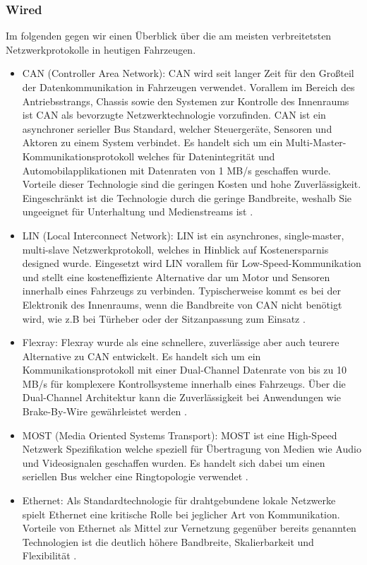         \subsubsection{Wired}
        Im folgenden gegen wir einen Überblick über die am meisten verbreitetsten Netzwerkprotokolle in heutigen Fahrzeugen. 
            \begin{itemize}
                \item CAN (Controller Area Network): CAN wird seit langer Zeit für den Großteil der Datenkommunikation in Fahrzeugen verwendet.
                Vorallem im Bereich des Antriebsstrangs, Chassis sowie den Systemen zur Kontrolle des Innenraums ist CAN als bevorzugte Netzwerktechnologie vorzufinden.
                CAN ist ein asynchroner serieller Bus Standard, welcher Steuergeräte, Sensoren und Aktoren zu einem System verbindet. Es handelt sich um ein 
                Multi-Master-Kommunikationsprotokoll welches für Datenintegrität und Automobilapplikationen mit Datenraten von 1 MB/s geschaffen wurde. Vorteile
                dieser Technologie sind die geringen Kosten und hohe Zuverlässigkeit. Eingeschränkt ist die Technologie durch die geringe Bandbreite, weshalb Sie
                ungeeignet für Unterhaltung und Medienstreams ist \cite{TW_huang2018vehicle}.
                \item LIN (Local Interconnect Network): LIN ist ein asynchrones, single-master, multi-slave Netzwerkprotokoll, welches in Hinblick auf Kostenersparnis 
                designed wurde. Eingesetzt wird LIN vorallem für Low-Speed-Kommunikation und stellt eine kosteneffiziente Alternative dar um Motor und Sensoren innerhalb 
                eines Fahrzeugs zu verbinden. Typischerweise kommt es bei der Elektronik des Innenraums, wenn die Bandbreite von CAN nicht benötigt wird, wie z.B bei Türheber
                oder der Sitzanpassung zum Einsatz \cite{TW_huang2018vehicle}.
                \item Flexray: Flexray wurde als eine schnellere, zuverlässige aber auch teurere Alternative zu CAN entwickelt. Es handelt sich um ein Kommunikationsprotokoll mit einer
                Dual-Channel Datenrate von bis zu 10 MB/s für komplexere Kontrollsysteme innerhalb eines Fahrzeugs. Über die Dual-Channel Architektur kann die Zuverlässigkeit
                bei Anwendungen wie Brake-By-Wire gewährleistet werden \cite{TW_huang2018vehicle}. 
                \item MOST (Media Oriented Systems Transport): MOST ist eine High-Speed Netzwerk Spezifikation welche speziell für Übertragung von Medien wie Audio und Videosignalen 
                geschaffen wurden. Es handelt sich dabei um einen seriellen Bus welcher eine Ringtopologie verwendet \cite{TW_huang2018vehicle}.
                \item Ethernet: Als Standardtechnologie für drahtgebundene lokale Netzwerke spielt Ethernet eine kritische Rolle bei jeglicher Art von Kommunikation.
                Vorteile von Ethernet als Mittel zur Vernetzung gegenüber bereits genannten Technologien ist die deutlich höhere Bandbreite, Skalierbarkeit und Flexibilität \cite{IVN}. 
            \end{itemize}
